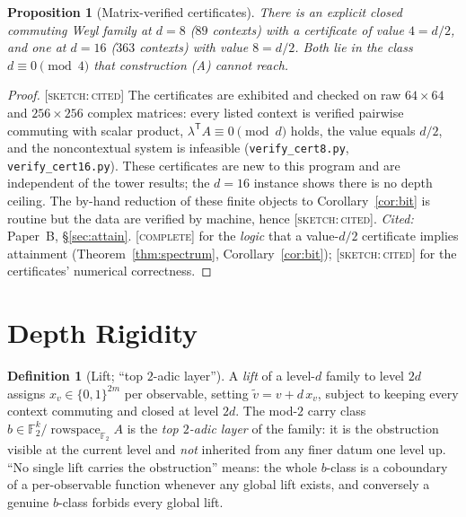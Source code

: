 \documentclass[11pt]{article}
\newtheorem{proposition}[theorem]{Proposition}
\theoremstyle{definition}
\newtheorem{definition}[theorem]{Definition}
\theoremstyle{remark}
\newcommand{\F}{\mathbb{F}}
\DeclareMathOperator{\rowspace}{rowspace}
\newcommand{\CO}{\textnormal{\textsc{[complete]}}}
\newcommand{\SK}{\textnormal{\textsc{[sketch:\,cited]}}}
\begin{document}
\begin{proposition}[Matrix-verified certificates]\label{prop:explicit}
There is an explicit closed commuting Weyl family at $d=8$ ($89$ contexts) with a certificate of value
$4=d/2$, and one at $d=16$ ($363$ contexts) with value $8=d/2$. Both lie in the class
$d\equiv0\pmod4$ that construction (A) cannot reach.
\end{proposition}
\begin{proof}
\SK{} The certificates are exhibited and checked on raw $64\times64$ and $256\times256$ complex
matrices: every listed context is verified pairwise commuting with scalar product, $\lambda^{\mathsf
T}A\equiv0\pmod d$ holds, the value equals $d/2$, and the noncontextual system is infeasible
(\texttt{verify\_cert8.py}, \texttt{verify\_cert16.py}). These certificates are new to this program
and are independent of the tower results; the $d=16$ instance shows there is no depth ceiling. The
by-hand reduction of these finite objects to Corollary~\ref{cor:bit} is routine but the data are
verified by machine, hence \SK. \emph{Cited:} Paper~B, \S\ref{sec:attain}. \CO{} for the
\emph{logic} that a value-$d/2$ certificate implies attainment (Theorem~\ref{thm:spectrum},
Corollary~\ref{cor:bit}); \SK{} for the certificates' numerical correctness.
\end{proof}

\section{Depth Rigidity}\label{sec:depth}

\begin{definition}[Lift; ``top $2$-adic layer'']\label{def:lift}
A \emph{lift} of a level-$d$ family to level $2d$ assigns $x_v\in\{0,1\}^{2m}$ per observable,
setting $\tilde v=v+d\,x_v$, subject to keeping every context commuting and closed at level $2d$. The
mod-$2$ carry class $b\in\F_2^{k}/\rowspace_{\F_2}A$ is the \emph{top $2$-adic layer} of the family:
it is the obstruction visible at the current level and \emph{not} inherited from any finer datum one
level up. ``No single lift carries the obstruction'' means: the whole $b$-class is a coboundary of a
per-observable function whenever any global lift exists, and conversely a genuine $b$-class forbids
every global lift.
\end{definition}
\end{document}
